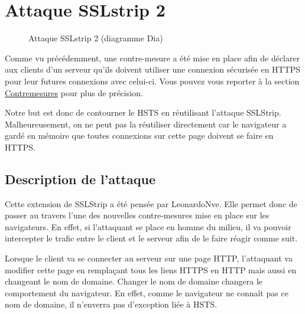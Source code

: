 \chapter{Attaque SSLstrip 2}

\label{sec:sslstrip2}

\begin{figure}[H]
  \caption{Attaque SSLstrip 2 (diagramme Dia)}
\end{figure}

Comme vu précédemment, une contre-mesure a été mise en place afin de déclarer aux clients d'un serveur qu'ils doivent utiliser une connexion sécurisée en HTTPS pour leur futures connexions avec celui-ci. Vous pouvez vous reporter à la section \hyperref[sec:hsts]{Contremesures} pour plus de précision.

Notre but est donc de contourner le HSTS en réutilisant l'attaque SSLStrip. Malheureusement, on ne peut pas la réutiliser directement car le navigateur a gardé en mémoire que toutes connexions sur cette page doivent se faire en HTTPS.

\section{Description de l'attaque}
Cette extension de SSLStrip a été pensée par LeonardoNve. Elle permet donc de passer au travers l'une des nouvelles contre-mesures mise en place sur les navigateurs. En effet, si l'attaquant se place en homme du milieu, il va pouvoir intercepter le trafic entre le client et le serveur afin de le faire réagir comme suit.

Lorsque le client va se connecter au serveur sur une page HTTP, l'attaquant va modifier cette page en remplaçant tous les liens HTTPS en HTTP mais aussi en changeant le nom de domaine. Changer le nom de domaine changera le comportement du navigateur. En effet, comme le navigateur ne connaît pas ce nom de domaine, il n'enverra pas d'exception liée à HSTS.

